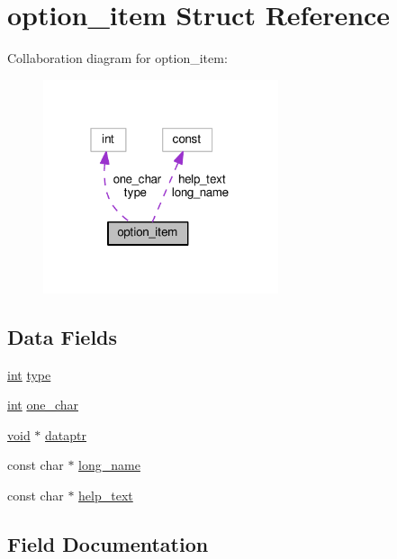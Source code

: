 \hypertarget{structoption__item}{}\section{option\+\_\+item Struct Reference}
\label{structoption__item}


Collaboration diagram for option\+\_\+item\+:
\nopagebreak
\begin{figure}[H]
\begin{center}
\leavevmode
\includegraphics[width=196pt]{structoption__item__coll__graph}
\end{center}
\end{figure}
\subsection*{Data Fields}
\begin{DoxyCompactItemize}
\item 
\hyperlink{pcre_8txt_a42dfa4ff673c82d8efe7144098fbc198}{int} \hyperlink{structoption__item_abdc24134c8aceecdcd6c543fd7680998}{type}
\item 
\hyperlink{pcre_8txt_a42dfa4ff673c82d8efe7144098fbc198}{int} \hyperlink{structoption__item_a3128d3758603f8be2b78df4760061e5b}{one\+\_\+char}
\item 
\hyperlink{group__MOD__ISAPI_gacd6cdbf73df3d9eed42fa493d9b621a6}{void} $\ast$ \hyperlink{structoption__item_ae685fbc6cfd991e87b381fbbf75d3610}{dataptr}
\item 
const char $\ast$ \hyperlink{structoption__item_a38272f77aaf451048e4f8add760686dd}{long\+\_\+name}
\item 
const char $\ast$ \hyperlink{structoption__item_a6b61195f7c186780fb199aaad1ed288e}{help\+\_\+text}
\end{DoxyCompactItemize}


\subsection{Field Documentation}
